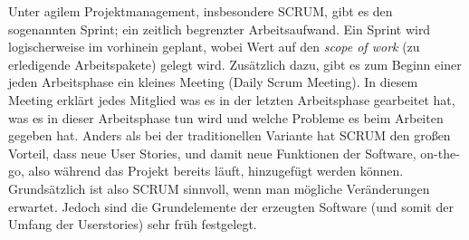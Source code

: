 Unter agilem Projektmanagement, insbesondere SCRUM, gibt es den sogenannten
Sprint; ein zeitlich begrenzter Arbeitsaufwand. Ein Sprint wird logischerweise im vorhinein geplant, wobei Wert auf den \textit{scope of work} (zu erledigende Arbeitspakete) gelegt wird. 
Zusätzlich dazu, gibt es zum Beginn einer jeden
Arbeitsphase ein kleines Meeting (Daily Scrum Meeting). In diesem Meeting erklärt jedes Mitglied was es in der letzten Arbeitsphase gearbeitet hat, was es in dieser Arbeitsphase tun wird und welche Probleme es beim Arbeiten gegeben hat.
Anders als bei der traditionellen Variante hat SCRUM den großen Vorteil, dass neue User Stories, und damit neue Funktionen der Software, on-the-go, also während das Projekt bereits läuft, hinzugefügt werden können. 
Grundsätzlich ist also SCRUM sinnvoll, wenn man mögliche Veränderungen erwartet. Jedoch sind die Grundelemente der erzeugten Software (und somit der Umfang der Userstories) sehr früh festgelegt.